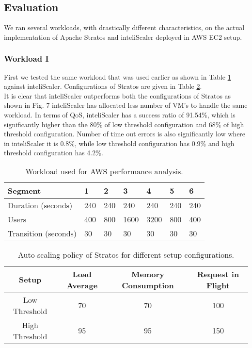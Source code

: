 \subsection{Evaluation}

We ran several workloads, with drastically different characteristics, on the actual implementation of Apache Stratos and inteliScaler deployed in AWS EC2 setup.

\subsubsection{Workload I}
First we tested the same workload that was used earlier as shown in Table \ref{table:analysis_workload} against inteliScaler. Configurations of Stratos are given in Table \ref{table:policy_threshold}.\\

It is clear that inteliScaler outperforms both the configurations of Stratos as shown in Fig. 7 inteliScaler has allocated less number of VM's to handle the same workload. In terms of QoS, inteliScaler has a success ratio of 91.54\%, which is significantly higher than the 80\% of low threshold configuration and 68\% of high threshold configuration. Number of time out errors is also significantly low where in inteliScaler it is 0.8\%, while low threshold configuration has 0.9\% and high threshold configuration has 4.2\%.\\

\begin{table}[h!]
\centering
\caption{Workload used for AWS performance analysis.}
\label{table:analysis_workload}
\begin{tabular}{|l|l|l|l|l|l|l|}
\hline
Segment & 1 & 2 & 3 & 4 & 5 & 6\\ \hline
Duration (seconds) & 240 & 240 & 240 & 240 & 240 & 240 \\ \hline
Users & 400 & 800 & 1600 & 3200 & 800 & 400 \\ \hline
Transition (seconds) & 30 & 30 & 30 & 30 & 30 & 30 \\ \hline
\end{tabular}
\end{table}

\begin{table}[h!]
\centering
\caption{Auto-scaling policy of Stratos for different setup configurations.}
\label{table:policy_threshold}
\begin{tabular}{|c|c|c|c|}
\hline
Setup & Load Average & Memory Consumption & Request in Flight \\ \hline
Low Threshold & 70 & 70 & 100\\ \hline
High Threshold & 95 & 95 & 150\\ \hline
\end{tabular}
\end{table}
